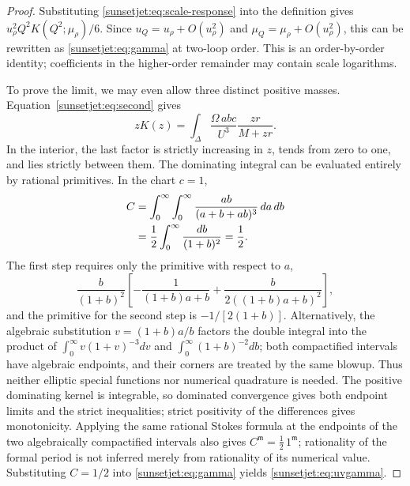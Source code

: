 \documentclass[11pt,a4paper,oneside]{article}
\theoremstyle{plain}
\theoremstyle{definition}
\theoremstyle{remark}
\numberwithin{equation}{section}
\begin{document}
\begin{proof}
Substituting \eqref{sunsetjet:eq:scale-response} into the definition
gives $u_\rho^2Q^2K(Q^2;\mu_\rho)/6$.
Since $u_Q=u_\rho+O(u_\rho^2)$ and $\mu_Q=\mu_\rho+O(u_\rho^2)$,
this can be rewritten as \eqref{sunsetjet:eq:gamma} at two-loop order.
This is an order-by-order identity; coefficients in the higher-order remainder may contain scale logarithms.

To prove the limit, we may even allow three distinct positive masses.
Equation~\eqref{sunsetjet:eq:second} gives
\begin{equation}\label{sunsetjet:eq:monotone}
 zK(z)=\int_\Delta\frac{\Omega\,abc}{U^3}
                    \frac{zr}{M+zr}.
\end{equation}
In the interior, the last factor is strictly increasing in $z$, tends from zero to one, and lies strictly between them.
The dominating integral can be evaluated entirely by rational primitives.
In the chart $c=1$,
\begin{align}
 C&=\int_0^\infty\int_0^\infty
          \frac{ab}{(a+b+ab)^3}\,da\,db \notag\\
  &=\frac12\int_0^\infty\frac{db}{(1+b)^2}
   =\frac12. \label{sunsetjet:eq:C}
\end{align}
The first step requires only the primitive with respect to $a$,
\[
 \frac{b}{(1+b)^2}
 \left[-\frac{1}{(1+b)a+b}
       +\frac{b}{2((1+b)a+b)^2}\right],
\]
and the primitive for the second step is $-1/[2(1+b)]$.
Alternatively, the algebraic substitution $v=(1+b)a/b$ factors the double integral into the product of
$\int_0^\infty v(1+v)^{-3}dv$ and
$\int_0^\infty(1+b)^{-2}db$;
both compactified intervals have algebraic endpoints, and their corners are treated by the same blowup.
Thus neither elliptic special functions nor numerical quadrature is needed.
The positive dominating kernel is integrable, so dominated convergence gives both endpoint limits and the strict inequalities;
strict positivity of the differences gives monotonicity.
Applying the same rational Stokes formula at the endpoints of the two algebraically compactified intervals
also gives $C^{\mathfrak m}=\tfrac12\,1^{\mathfrak m}$;
rationality of the formal period is not inferred merely from rationality of its numerical value.
Substituting $C=1/2$ into \eqref{sunsetjet:eq:gamma} yields \eqref{sunsetjet:eq:uvgamma}.
\end{proof}
\end{document}
